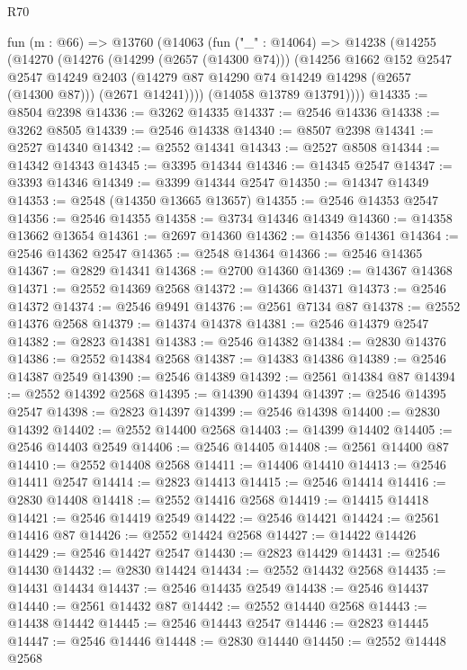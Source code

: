 \begin{lexlean}{R70}
\begin{coremodule}
  fun (m : @66) =>
  @13760
    (@14063
      (fun ("_" : @14064) =>
      @14238
        (@14255
          (@14270
            (@14276
              (@14299 (@2657 (@14300 @74)))
              (@14256
                @1662
                @152
                @2547
                @2547
                @14249
                @2403
                (@14279 @87 @14290 @74 @14249 @14298 (@2657 (@14300 @87)))
                (@2671 @14241))))
          (@14058 @13789 @13791))))
@14335 := @8504 @2398
@14336 := @3262 @14335
@14337 := @2546 @14336
@14338 := @3262 @8505
@14339 := @2546 @14338
@14340 := @8507 @2398
@14341 := @2527 @14340
@14342 := @2552 @14341
@14343 := @2527 @8508
@14344 := @14342 @14343
@14345 := @3395 @14344
@14346 := @14345 @2547
@14347 := @3393 @14346
@14349 := @3399 @14344 @2547
@14350 := @14347 @14349
@14353 := @2548 (@14350 @13665 @13657)
@14355 := @2546 @14353 @2547
@14356 := @2546 @14355
@14358 := @3734 @14346 @14349
@14360 := @14358 @13662 @13654
@14361 := @2697 @14360
@14362 := @14356 @14361
@14364 := @2546 @14362 @2547
@14365 := @2548 @14364
@14366 := @2546 @14365
@14367 := @2829 @14341
@14368 := @2700 @14360
@14369 := @14367 @14368
@14371 := @2552 @14369 @2568
@14372 := @14366 @14371
@14373 := @2546 @14372
@14374 := @2546 @9491
@14376 := @2561 @7134 @87
@14378 := @2552 @14376 @2568
@14379 := @14374 @14378
@14381 := @2546 @14379 @2547
@14382 := @2823 @14381
@14383 := @2546 @14382
@14384 := @2830 @14376
@14386 := @2552 @14384 @2568
@14387 := @14383 @14386
@14389 := @2546 @14387 @2549
@14390 := @2546 @14389
@14392 := @2561 @14384 @87
@14394 := @2552 @14392 @2568
@14395 := @14390 @14394
@14397 := @2546 @14395 @2547
@14398 := @2823 @14397
@14399 := @2546 @14398
@14400 := @2830 @14392
@14402 := @2552 @14400 @2568
@14403 := @14399 @14402
@14405 := @2546 @14403 @2549
@14406 := @2546 @14405
@14408 := @2561 @14400 @87
@14410 := @2552 @14408 @2568
@14411 := @14406 @14410
@14413 := @2546 @14411 @2547
@14414 := @2823 @14413
@14415 := @2546 @14414
@14416 := @2830 @14408
@14418 := @2552 @14416 @2568
@14419 := @14415 @14418
@14421 := @2546 @14419 @2549
@14422 := @2546 @14421
@14424 := @2561 @14416 @87
@14426 := @2552 @14424 @2568
@14427 := @14422 @14426
@14429 := @2546 @14427 @2547
@14430 := @2823 @14429
@14431 := @2546 @14430
@14432 := @2830 @14424
@14434 := @2552 @14432 @2568
@14435 := @14431 @14434
@14437 := @2546 @14435 @2549
@14438 := @2546 @14437
@14440 := @2561 @14432 @87
@14442 := @2552 @14440 @2568
@14443 := @14438 @14442
@14445 := @2546 @14443 @2547
@14446 := @2823 @14445
@14447 := @2546 @14446
@14448 := @2830 @14440
@14450 := @2552 @14448 @2568

\end{coremodule}
\end{lexlean}
